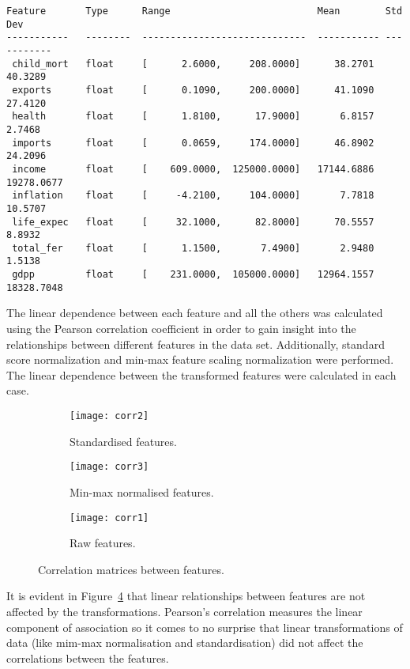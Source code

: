 \documentclass[
  course = {{DS12E Clustering Algorithms}},
  quartile = {{2}},
  assignment = 2,
  name = {{Michael Darmanis ; Vasilios Venieris}},
  studentnumber = {{7115152200004 ; 7115152200017}},
  email = {{mdarm@di.uoa.gr ; vvenieris@di.uoa.gr}},
  firstexercise = 1
]{aga-homework}
\begin{document}
\begin{verbatim}
Feature       Type      Range                          Mean        Std Dev    
-----------   --------  -----------------------------  ----------- -----------
 child_mort   float     [      2.6000,     208.0000]      38.2701      40.3289
 exports      float     [      0.1090,     200.0000]      41.1090      27.4120
 health       float     [      1.8100,      17.9000]       6.8157       2.7468
 imports      float     [      0.0659,     174.0000]      46.8902      24.2096
 income       float     [    609.0000,  125000.0000]   17144.6886   19278.0677
 inflation    float     [     -4.2100,     104.0000]       7.7818      10.5707
 life_expec   float     [     32.1000,      82.8000]      70.5557       8.8932
 total_fer    float     [      1.1500,       7.4900]       2.9480       1.5138
 gdpp         float     [    231.0000,  105000.0000]   12964.1557   18328.7048
\end{verbatim}

The linear dependence between each feature and all the others was calculated using the Pearson correlation coefficient in order to gain insight into the relationships between different features in the data set. Additionally, standard score normalization and min-max feature scaling normalization were performed. The linear dependence between the transformed features were calculated in each case.
        
\begin{figure}[htbp]

\centering
\begin{subfigure}{0.4\textwidth}
    \texttt{[image: corr2]}
    \caption{Standardised features.}
    \label{fig:first}
\end{subfigure}
\hfill
\begin{subfigure}{0.4\textwidth}
    \texttt{[image: corr3]}
    \caption{Min-max normalised features.}
    \label{fig:second}
\end{subfigure}
\hfill
\begin{subfigure}{0.4\textwidth}
    \texttt{[image: corr1]}
    \caption{Raw features.}
    \label{fig:third}
\end{subfigure}
        
\caption{Correlation matrices between features.}
\label{fig:figures}

\end{figure}

It is evident in Figure~\ref{fig:figures} that linear relationships between features are not affected by the transformations. Pearson's correlation measures the linear component of association so it comes to no surprise that linear transformations of data (like mim-max normalisation and standardisation) did not affect the correlations between the features.
\end{document}
